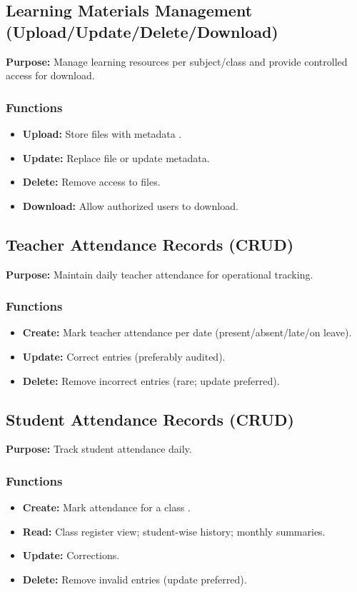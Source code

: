 \documentclass[12pt,a4paper]{article}
\begin{document}
\subsection{Learning Materials Management (Upload/Update/Delete/Download)}
\textbf{Purpose:} Manage learning resources per subject/class and provide controlled access for download.

\subsubsection*{Functions}
\begin{itemize}[leftmargin=*]
  \item \textbf{Upload:} Store files with metadata .
  \item \textbf{Update:} Replace file or update metadata.
  \item \textbf{Delete:} Remove access to files.
  \item \textbf{Download:} Allow authorized users to download.
\end{itemize}


\subsection{Teacher Attendance Records (CRUD)}
\textbf{Purpose:} Maintain daily teacher attendance for operational tracking.

\subsubsection*{Functions}
\begin{itemize}[leftmargin=*]
  \item \textbf{Create:} Mark teacher attendance per date (present/absent/late/on leave).
  \item \textbf{Update:} Correct entries (preferably audited).
  \item \textbf{Delete:} Remove incorrect entries (rare; update preferred).
\end{itemize}


\subsection{Student Attendance Records (CRUD)}
\textbf{Purpose:} Track student attendance daily.

\subsubsection*{Functions}
\begin{itemize}[leftmargin=*]
  \item \textbf{Create:} Mark attendance for a class .
  \item \textbf{Read:} Class register view; student-wise history; monthly summaries.
  \item \textbf{Update:} Corrections.
  \item \textbf{Delete:} Remove invalid entries (update preferred).
\end{itemize}
\end{document}

